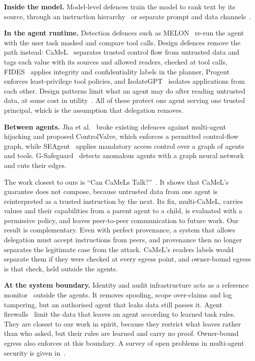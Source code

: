 \documentclass[conference,compsoc]{IEEEtran}
\begin{document}
\textbf{Inside the model.} Model-level defences train the model to rank text by its source, through an instruction hierarchy~\cite{wallace2024hierarchy} or separate prompt and data channels~\cite{chen2025struq}.

\textbf{In the agent runtime.} Detection defences such as MELON~\cite{zhu2025melon} re-run the agent with the user task masked and compare tool calls. Design defences remove the path instead: CaMeL~\cite{debenedetti2025camel} separates trusted control flow from untrusted data and tags each value with its sources and allowed readers, checked at tool calls, FIDES~\cite{costa2025} applies integrity and confidentiality labels in the planner, Progent~\cite{shi2025progent} enforces least-privilege tool policies, and IsolateGPT~\cite{wu2025isolategpt} isolates applications from each other. Design patterns limit what an agent may do after reading untrusted data, at some cost in utility~\cite{beurerkellner2025patterns}. All of these protect one agent serving one trusted principal, which is the assumption that delegation removes.

\textbf{Between agents.} Jha et al.~\cite{jha2025} broke existing defences against multi-agent hijacking and proposed ControlValve, which enforces a permitted control-flow graph, while SEAgent~\cite{ji2026} applies mandatory access control over a graph of agents and tools. G-Safeguard~\cite{wang2025gsafeguard} detects anomalous agents with a graph neural network and cuts their edges.

The work closest to ours is ``Can CaMeLs Talk?''~\cite{petersgill2026}. It shows that CaMeL's guarantee does not compose, because untrusted data from one agent is reinterpreted as a trusted instruction by the next. Its fix, multi-CaMeL, carries values and their capabilities from a parent agent to a child, is evaluated with a permissive policy, and leaves peer-to-peer communication to future work. Our result is complementary. Even with perfect provenance, a system that allows delegation must accept instructions from peers, and provenance then no longer separates the legitimate case from the attack. CaMeL's readers labels would separate them if they were checked at every egress point, and owner-bound egress is that check, held outside the agents.

\textbf{At the system boundary.} Identity and audit infrastructure acts as a reference monitor~\cite{anderson1972} outside the agents. It removes spoofing, scope over-claims and log tampering, but an authorised agent that leaks data still passes it. Agent firewalls~\cite{abdelnabi2025firewalls} limit the data that leaves an agent according to learned task rules. They are closest to our work in spirit, because they restrict what leaves rather than who asked, but their rules are learned and carry no proof. Owner-bound egress also enforces at this boundary. A survey of open problems in multi-agent security is given in~\cite{schroederdewitt2025}.
\end{document}
